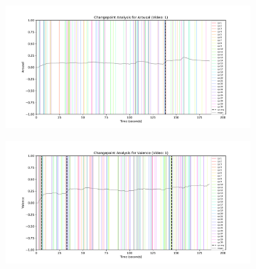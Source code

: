 \documentclass[11pt, letterpaper]{article}
\begin{document}
\begin{figure}
    \centering
    \begin{subfigure}[t]{0.49\textwidth}
        \centering
        \includegraphics[width=\linewidth]{changepoints_V1_arousal_avg} 
        \caption{} \label{fig:changepoints_V1_arousal_avg}
    \end{subfigure}
    \hfill
    \begin{subfigure}[t]{0.49\textwidth}
        \centering
        \includegraphics[width=\linewidth]{changepoints_V1_valence_avg} 
        \caption{} \label{fig:changepoints_V1_valence_avg}
    \end{subfigure}

    \vspace{1cm}
    

\end{figure}
\end{document}
